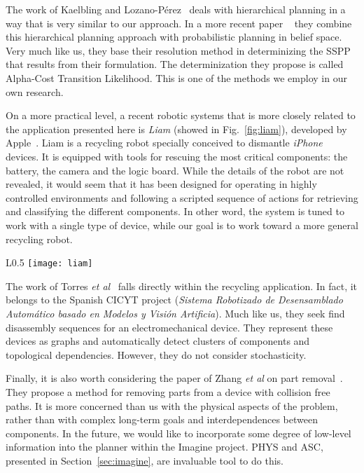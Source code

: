 \documentclass[../root.tex]{subfiles}
\begin{document}
The work of Kaelbling and Lozano-Pérez~%
\cite{kaelbling2011hierarchical} deals with hierarchical planning in
a way that is very similar to our approach. In a more recent paper%
~\cite{kaelbling2013integrated} they combine this hierarchical planning
approach with probabilistic planning in belief space. Very much like us,
they base their resolution method in determinizing the SSPP that results
from their formulation. The determinization they propose is called
Alpha-Cost Transition Likelihood. This is one of the methods we employ in our
own research. 

On a more practical level, a recent robotic systems that is more
closely related to the application
presented here is \emph{Liam} (showed in Fig.~\ref{fig:liam}), developed by Apple~\cite{kamps2016apple}.
Liam is a recycling robot specially conceived to dismantle \emph{iPhone}
devices. It is equipped with tools for rescuing the most critical components:
the battery, the camera and the logic board. While the details of the robot
are not revealed, it would seem that it has been designed for operating
in highly controlled environments and following a scripted sequence of
actions for retrieving and classifying the different components. In other
word, the system is tuned to work with a single type of device, while our
goal is to work toward a more general recycling robot.

\begin{wrapfigure}{L}{0.5\columnwidth}
	\centering
	\texttt{[image: liam]}
	\caption{Liam robot removing the screen of an iPhone device.
		Source: \url{https://youtu.be/AYshVbcEmUc}}
	\label{fig:liam}
\end{wrapfigure}

The work of Torres \textit{et al}~\cite{torresa2003disassembly} falls
directly within the recycling application. In fact, it belongs to the
Spanish CICYT project (\emph{Sistema Robotizado de Desensamblado
Automático basado en Modelos y Visión Artificia}). Much like us, they
seek find disassembly sequences for an electromechanical device. They
represent these devices as graphs and automatically detect clusters of
components and topological dependencies. However, they do not consider
stochasticity.

Finally, it is also worth considering the paper of
Zhang \textit{et al} on part removal~\cite{zhang2008dplan}. They propose
a method for removing parts from a device with collision free paths. It
is more concerned than us with the physical aspects of the problem,
rather than with complex long-term goals and interdependences between
components. In the future, we would like to incorporate some degree
of low-level information into the planner within the Imagine project.
PHYS and ASC, presented in Section~\ref{sec:imagine}, are invaluable
tool to do this.

\end{document}
